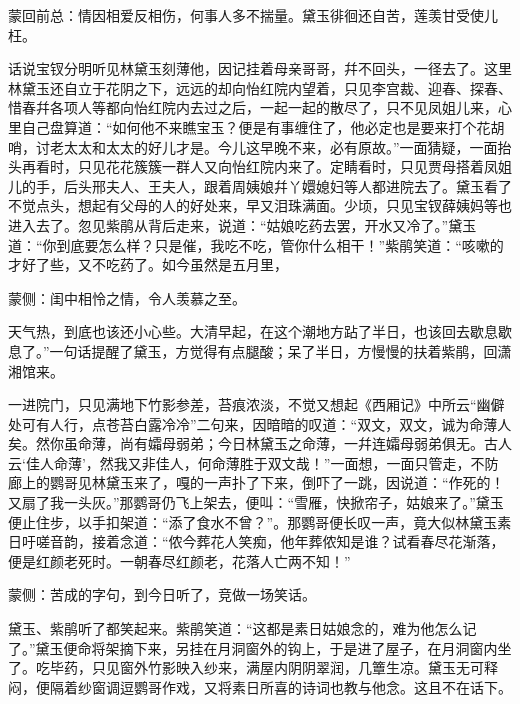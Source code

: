 
\begin{parag}
    \begin{note}蒙回前总：情因相爱反相伤，何事人多不揣量。黛玉徘徊还自苦，莲羡甘受使儿枉。\end{note}
\end{parag}


\begin{parag}
    话说宝钗分明听见林黛玉刻薄他，因记挂着母亲哥哥，幷不回头，一径去了。这里林黛玉还自立于花阴之下，远远的却向怡红院内望着，只见李宫裁、迎春、探春、惜春幷各项人等都向怡红院内去过之后，一起一起的散尽了，只不见凤姐儿来，心里自己盘算道：“如何他不来瞧宝玉？便是有事缠住了，他必定也是要来打个花胡哨，讨老太太和太太的好儿才是。今儿这早晚不来，必有原故。”一面猜疑，一面抬头再看时，只见花花簇簇一群人又向怡红院内来了。定睛看时，只见贾母搭着凤姐儿的手，后头邢夫人、王夫人，跟着周姨娘幷丫嬛媳妇等人都进院去了。黛玉看了不觉点头，想起有父母的人的好处来，早又泪珠满面。少顷，只见宝钗薛姨妈等也进入去了。忽见紫鹃从背后走来，说道：“姑娘吃药去罢，开水又冷了。”黛玉道：“你到底要怎么样？只是催，我吃不吃，管你什么相干！”紫鹃笑道：“咳嗽的才好了些，又不吃药了。如今虽然是五月里，\begin{note}蒙侧：闺中相怜之情，令人羡慕之至。\end{note}天气热，到底也该还小心些。大清早起，在这个潮地方跕了半日，也该回去歇息歇息了。”一句话提醒了黛玉，方觉得有点腿酸；呆了半日，方慢慢的扶着紫鹃，回潇湘馆来。
\end{parag}


\begin{parag}
    一进院门，只见满地下竹影参差，苔痕浓淡，不觉又想起《西厢记》中所云“幽僻处可有人行，点苍苔白露冷冷”二句来，因暗暗的叹道：“双文，双文，诚为命薄人矣。然你虽命薄，尚有孀母弱弟；今日林黛玉之命薄，一幷连孀母弱弟俱无。古人云‘佳人命薄’，然我又非佳人，何命薄胜于双文哉！”一面想，一面只管走，不防廊上的鹦哥见林黛玉来了，嘎的一声扑了下来，倒吓了一跳，因说道：“作死的！又扇了我一头灰。”那鹦哥仍飞上架去，便叫：“雪雁，快掀帘子，姑娘来了。”黛玉便止住步，以手扣架道：“添了食水不曾？”。那鹦哥便长叹一声，竟大似林黛玉素日吁嗟音韵，接着念道：“侬今葬花人笑痴，他年葬侬知是谁？试看春尽花渐落，便是红颜老死时。一朝春尽红颜老，花落人亡两不知！”\begin{note}蒙侧：苦成的字句，到今日听了，竞做一场笑话。\end{note}黛玉、紫鹃听了都笑起来。紫鹃笑道：“这都是素日姑娘念的，难为他怎么记了。”黛玉便命将架摘下来，另挂在月洞窗外的钩上，于是进了屋子，在月洞窗内坐了。吃毕药，只见窗外竹影映入纱来，满屋内阴阴翠润，几簟生凉。黛玉无可释闷，便隔着纱窗调逗鹦哥作戏，又将素日所喜的诗词也教与他念。这且不在话下。
\end{parag}


